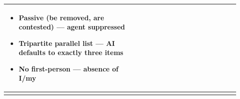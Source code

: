 \documentclass[11pt]{article}
\begin{document}
\begin{longtable}{|p{0.55\linewidth}|p{0.40\linewidth}|}
\begin{itemize}[leftmargin=1em,itemsep=1pt,topsep=1pt,parsep=0pt]
  \item Passive (be removed, are contested) --- agent suppressed
  \item Tripartite parallel list --- AI defaults to exactly three items
  \item No first-person --- absence of I/my
\end{itemize} \\[2pt]
\hline
\rule[-3.5cm]{0pt}{3.5cm} & \\
\hline
\end{longtable}
\end{document}
